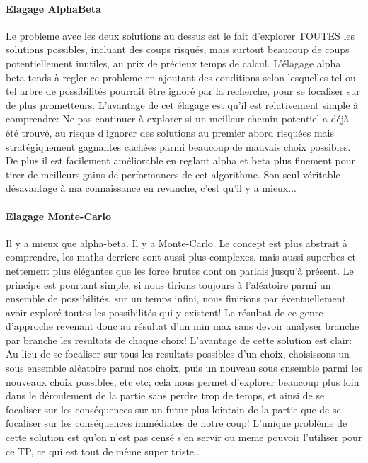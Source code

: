 \documentclass{scrreprt}
\begin{document}
    \paragraph{Elagage AlphaBeta}
    Le probleme avec les deux solutions au dessus est le fait d'explorer
    TOUTES les solutions possibles, incluant des coups risqués, mais surtout
    beaucoup de coups potentiellement inutiles, au prix de précieux temps de
    calcul.
    L'élagage alpha beta tends à regler ce probleme en ajoutant des
    conditions selon lesquelles tel ou tel arbre de possibilités pourrait
    être ignoré par la recherche, pour se focaliser sur de plus prometteurs.
    L'avantage de cet élagage est qu'il est relativement simple à comprendre:
    Ne pas continuer à explorer si un meilleur chemin potentiel a déjà été
    trouvé, au risque d'ignorer des solutions au premier abord risquées mais
    stratégiquement gagnantes cachées parmi beaucoup de mauvais choix possibles.
    De plus il est facilement améliorable en reglant alpha et beta plus
    finement pour tirer de meilleurs gains de performances de cet algorithme.
    Son seul véritable désavantage à ma connaissance en revanche, c'est qu'il
    y a mieux...

    \paragraph{Elagage Monte-Carlo}
    Il y a mieux que alpha-beta.
    Il y a Monte-Carlo.
    Le concept est plus abstrait à comprendre, les maths derriere sont aussi
    plus complexes, mais aussi superbes et nettement plus élégantes que les
    force brutes dont on parlais jusqu'à présent.
    Le principe est pourtant simple, si nous tirions toujours à l'aléatoire
    parmi un ensemble de possibilités, sur un temps infini, nous finirions
    par éventuellement avoir exploré toutes les possibilités qui y existent!
    Le résultat de ce genre d'approche revenant donc au résultat d'un min max
    sans devoir analyser branche par branche les resultats de chaque choix!
    L'avantage de cette solution est clair: Au lieu de se focaliser sur tous
    les resultats possibles d'un choix, choisissons un sous ensemble
    aléatoire parmi nos choix, puis un nouveau sous ensemble parmi les
    nouveaux choix possibles, etc etc; cela nous permet d'explorer beaucoup
    plus loin dans le déroulement de la partie sans perdre trop de temps, et
    ainsi de se focaliser sur les conséquences sur un futur plus lointain de la
    partie que de se focaliser sur les conséquences immédiates de notre coup!
    L'unique problème de cette solution est qu'on n'est pas censé s'en servir
    ou meme pouvoir l'utiliser pour ce TP, ce qui est tout de même super
    triste..
\end{document}
